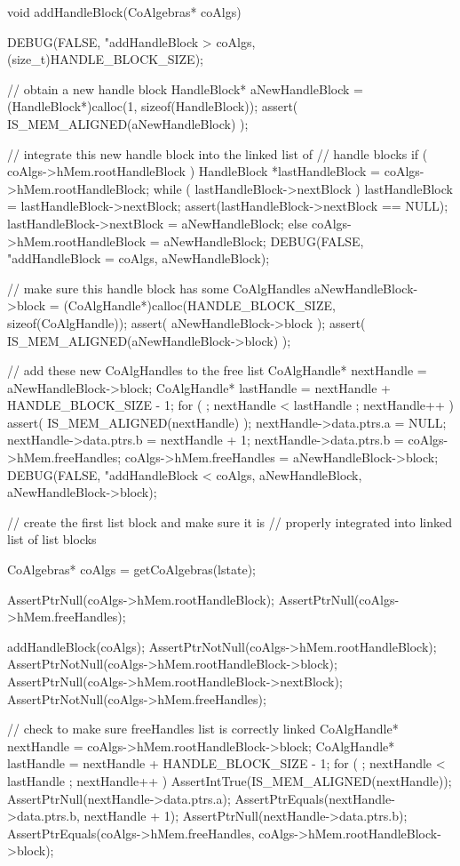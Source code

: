 \startCCode
void addHandleBlock(CoAlgebras* coAlgs) {
  DEBUG(FALSE, "addHandleBlock > %
    coAlgs, (size_t)HANDLE_BLOCK_SIZE);

  // obtain a new handle block
  HandleBlock* aNewHandleBlock = 
    (HandleBlock*)calloc(1, sizeof(HandleBlock));
  assert( IS_MEM_ALIGNED(aNewHandleBlock) );

  // integrate this new handle block into the linked list of
  // handle blocks
  if ( coAlgs->hMem.rootHandleBlock ) {
    HandleBlock *lastHandleBlock = coAlgs->hMem.rootHandleBlock;
    while ( lastHandleBlock->nextBlock ) {
      lastHandleBlock = lastHandleBlock->nextBlock;
    }
    assert(lastHandleBlock->nextBlock == NULL);
    lastHandleBlock->nextBlock = aNewHandleBlock;
  } else {
    coAlgs->hMem.rootHandleBlock = aNewHandleBlock;
  }
  DEBUG(FALSE, "addHandleBlock = %
    coAlgs, aNewHandleBlock);

  // make sure this handle block has some CoAlgHandles
  aNewHandleBlock->block = 
    (CoAlgHandle*)calloc(HANDLE_BLOCK_SIZE, sizeof(CoAlgHandle));
  assert( aNewHandleBlock->block );
  assert( IS_MEM_ALIGNED(aNewHandleBlock->block) );

  // add these new CoAlgHandles to the free list
  CoAlgHandle* nextHandle = aNewHandleBlock->block;
  CoAlgHandle* lastHandle = nextHandle + HANDLE_BLOCK_SIZE - 1;
  for ( ; nextHandle < lastHandle ; nextHandle++ ) {
    assert( IS_MEM_ALIGNED(nextHandle) );
    nextHandle->data.ptrs.a = NULL;
    nextHandle->data.ptrs.b = nextHandle + 1;
  }
  nextHandle->data.ptrs.b = coAlgs->hMem.freeHandles;
  coAlgs->hMem.freeHandles = aNewHandleBlock->block;
  DEBUG(FALSE, "addHandleBlock < %
    coAlgs, aNewHandleBlock, aNewHandleBlock->block);
}
\stopCCode

\startCTest
  // create the first list block and make sure it is 
  // properly integrated into linked list of list blocks

  CoAlgebras* coAlgs = getCoAlgebras(lstate);

  AssertPtrNull(coAlgs->hMem.rootHandleBlock);
  AssertPtrNull(coAlgs->hMem.freeHandles);

  addHandleBlock(coAlgs);
  AssertPtrNotNull(coAlgs->hMem.rootHandleBlock);
  AssertPtrNotNull(coAlgs->hMem.rootHandleBlock->block);
  AssertPtrNull(coAlgs->hMem.rootHandleBlock->nextBlock);
  AssertPtrNotNull(coAlgs->hMem.freeHandles);

  // check to make sure freeHandles list is correctly linked
  CoAlgHandle* nextHandle = coAlgs->hMem.rootHandleBlock->block;
  CoAlgHandle* lastHandle = nextHandle + HANDLE_BLOCK_SIZE - 1;
  for ( ; nextHandle < lastHandle ; nextHandle++ ) {
    AssertIntTrue(IS_MEM_ALIGNED(nextHandle));
    AssertPtrNull(nextHandle->data.ptrs.a);
    AssertPtrEquals(nextHandle->data.ptrs.b, nextHandle + 1);
  }
  AssertPtrNull(nextHandle->data.ptrs.b);
  AssertPtrEquals(coAlgs->hMem.freeHandles,
    coAlgs->hMem.rootHandleBlock->block);

